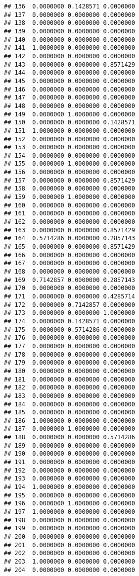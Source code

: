 \documentclass[
]{article}
\begin{document}
\begin{verbatim}
## 136  0.0000000 0.1428571 0.0000000
## 137  0.0000000 0.0000000 0.0000000
## 138  0.0000000 0.0000000 0.0000000
## 139  0.0000000 0.0000000 0.0000000
## 140  0.0000000 0.0000000 0.0000000
## 141  1.0000000 0.0000000 0.0000000
## 142  0.0000000 0.0000000 0.0000000
## 143  0.0000000 0.0000000 0.8571429
## 144  0.0000000 0.0000000 0.0000000
## 145  0.0000000 0.0000000 0.0000000
## 146  0.0000000 0.0000000 0.0000000
## 147  0.0000000 0.0000000 0.0000000
## 148  0.0000000 0.0000000 0.0000000
## 149  0.0000000 1.0000000 0.0000000
## 150  0.0000000 0.0000000 0.1428571
## 151  1.0000000 0.0000000 0.0000000
## 152  0.0000000 0.0000000 0.0000000
## 153  0.0000000 0.0000000 0.0000000
## 154  0.0000000 0.0000000 0.0000000
## 155  0.0000000 1.0000000 0.0000000
## 156  0.0000000 0.0000000 0.0000000
## 157  0.0000000 0.0000000 0.8571429
## 158  0.0000000 0.0000000 0.0000000
## 159  0.0000000 1.0000000 0.0000000
## 160  0.0000000 0.0000000 0.0000000
## 161  0.0000000 0.0000000 0.0000000
## 162  0.0000000 0.0000000 0.0000000
## 163  0.0000000 0.0000000 0.8571429
## 164  0.5714286 0.0000000 0.2857143
## 165  0.0000000 0.0000000 0.8571429
## 166  0.0000000 0.0000000 0.0000000
## 167  0.0000000 0.0000000 0.0000000
## 168  0.0000000 0.0000000 0.0000000
## 169  0.7142857 0.0000000 0.2857143
## 170  0.0000000 0.0000000 0.0000000
## 171  0.0000000 0.0000000 0.4285714
## 172  0.0000000 0.7142857 0.0000000
## 173  0.0000000 0.0000000 1.0000000
## 174  0.0000000 0.1428571 0.0000000
## 175  0.0000000 0.5714286 0.0000000
## 176  0.0000000 0.0000000 0.0000000
## 177  0.0000000 0.0000000 0.0000000
## 178  0.0000000 0.0000000 0.0000000
## 179  0.0000000 0.0000000 0.0000000
## 180  0.0000000 0.0000000 0.0000000
## 181  0.0000000 0.0000000 0.0000000
## 182  0.0000000 0.0000000 0.0000000
## 183  0.0000000 0.0000000 0.0000000
## 184  0.0000000 0.0000000 0.0000000
## 185  0.0000000 0.0000000 0.0000000
## 186  1.0000000 0.0000000 0.0000000
## 187  0.0000000 1.0000000 0.0000000
## 188  0.0000000 0.0000000 0.5714286
## 189  0.0000000 0.0000000 0.0000000
## 190  0.0000000 0.0000000 0.0000000
## 191  0.0000000 0.0000000 0.0000000
## 192  0.0000000 0.0000000 0.0000000
## 193  0.0000000 0.0000000 0.0000000
## 194  1.0000000 0.0000000 0.0000000
## 195  0.0000000 0.0000000 0.0000000
## 196  0.0000000 1.0000000 0.0000000
## 197  1.0000000 0.0000000 0.0000000
## 198  0.0000000 0.0000000 0.0000000
## 199  0.0000000 0.0000000 0.0000000
## 200  0.0000000 0.0000000 0.0000000
## 201  0.0000000 0.0000000 0.0000000
## 202  0.0000000 0.0000000 0.0000000
## 203  1.0000000 0.0000000 0.0000000
## 204  0.0000000 0.0000000 0.0000000

\end{verbatim}
\end{document}
